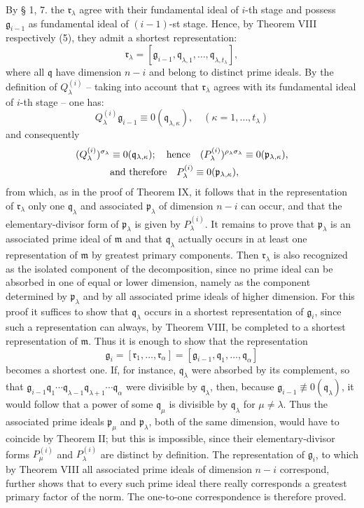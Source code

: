 \documentclass[11pt]{article}
\providecommand{\frakm}{\mathfrak m}
\providecommand{\frakp}{\mathfrak p}
\providecommand{\frakq}{\mathfrak q}
\providecommand{\frakr}{\mathfrak r}
\providecommand{\frakg}{\mathfrak g}
\providecommand{\frakp}{\mathfrak p}
\providecommand{\frakp}{\mathfrak p}
\providecommand{\frakq}{\mathfrak q}
\providecommand{\frakr}{\mathfrak r}
\begin{document}
By § 1, 7. the $\frakr_\lambda$ agree with their fundamental ideal of $i$-th stage and possess $\frakg_{i-1}$ as fundamental ideal of $(i-1)$-st stage. Hence, by Theorem VIII respectively (5), they admit a shortest representation:
\[
 \frakr_\lambda=[\frakg_{i-1},\frakq_{\lambda,1},\ldots,\frakq_{\lambda,t_\lambda}],
\]
where all $\frakq$ have dimension $n-i$ and belong to distinct prime ideals. By the definition of $Q_\lambda^{(i)}$ -- taking into account that $\frakr_\lambda$ agrees with its fundamental ideal of $i$-th stage -- one has:
\[
 Q_\lambda^{(i)}\frakg_{i-1}\equiv0(\frakq_{\lambda,\kappa}),
 \quad(\kappa=1,\ldots,t_\lambda)
\]
and consequently
\[
\begin{aligned}
 (Q_\lambda^{(i)})^{\sigma_\lambda}&\equiv0(\frakq_{\lambda,\kappa});
 \quad\hbox{hence}\quad
 (P_\lambda^{(i)})^{\rho_\lambda\sigma_\lambda}\equiv0(\frakp_{\lambda,\kappa}),\\
 &\hbox{and therefore}\quad P_\lambda^{(i)}\equiv0(\frakp_{\lambda,\kappa}),
\end{aligned}
\]
from which, as in the proof of Theorem IX, it follows that in the representation of $\frakr_\lambda$ only one $\frakq_\lambda$ and associated $\frakp_\lambda$ of dimension $n-i$ can occur, and that the elementary-divisor form of $\frakp_\lambda$ is given by $P_\lambda^{(i)}$. It remains to prove that $\frakp_\lambda$ is an associated prime ideal of $\frakm$ and that $\frakq_\lambda$ actually occurs in at least one representation of $\frakm$ by greatest primary components. Then $\frakr_\lambda$ is also recognized as the isolated component of the decomposition, since no prime ideal can be absorbed in one of equal or lower dimension, namely as the component determined by $\frakp_\lambda$ and by all associated prime ideals of higher dimension. For this proof it suffices to show that $\frakq_\lambda$ occurs in a shortest representation of $\frakg_i$, since such a representation can always, by Theorem VIII, be completed to a shortest representation of $\frakm$. Thus it is enough to show that the representation
\[
 \frakg_i=[\frakr_1,\ldots,\frakr_\alpha]=[\frakg_{i-1},\frakq_1,\ldots,\frakq_\alpha]
\]
becomes a shortest one. If, for instance, $\frakq_\lambda$ were absorbed by its complement, so that $\frakg_{i-1}\frakq_1\cdots\frakq_{\lambda-1}\frakq_{\lambda+1}\cdots\frakq_\alpha$ were divisible by $\frakq_\lambda$, then, because $\frakg_{i-1}\not\equiv0(\frakq_\lambda)$, it would follow that a power of some $\frakq_\mu$ is divisible by $\frakq_\lambda$ for $\mu\ne\lambda$. Thus the associated prime ideals $\frakp_\mu$ and $\frakp_\lambda$, both of the same dimension, would have to coincide by Theorem II; but this is impossible, since their elementary-divisor forms $P_\mu^{(i)}$ and $P_\lambda^{(i)}$ are distinct by definition. The representation of $\frakg_i$, to which by Theorem VIII all associated prime ideals of dimension $n-i$ correspond, further shows that to every such prime ideal there really corresponds a greatest primary factor of the norm. The one-to-one correspondence is therefore proved.
\end{document}

